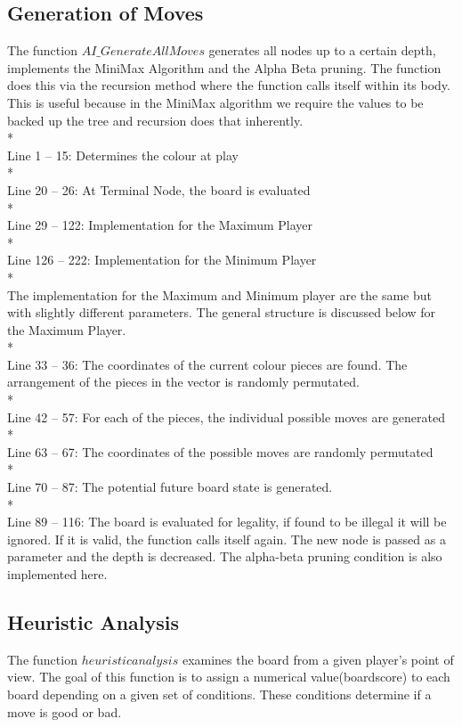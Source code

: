 \documentclass[11pt,a4paper]{article}
\begin{document}
\subsection{Generation of Moves}
\indent\indent The function $AI\_GenerateAllMoves$ generates all nodes up to a certain depth, implements the MiniMax Algorithm and the Alpha Beta pruning. The function does this via the recursion method where the function calls itself within its body. This is useful because in the MiniMax algorithm we require the values to be backed up the tree and recursion does that inherently.
\\*\\
Line 1 – 15: Determines the colour at play
\\*\\
Line 20 – 26: At Terminal Node, the board is evaluated
\\*\\
Line 29 – 122: Implementation for the Maximum Player
\\*\\
Line 126 – 222: Implementation for the Minimum Player\newline
\\*\\
\indent The implementation for the Maximum and Minimum player are the same but with slightly different parameters. The general structure is discussed below for the Maximum Player.
\\*\\
Line 33 – 36: The coordinates of the current colour pieces are found. The arrangement of the pieces in the vector is randomly permutated.
\\*\\
Line 42 – 57: For each of the pieces, the individual possible moves are generated
\\*\\
Line 63 – 67: The coordinates of the possible moves are randomly permutated
\\*\\
Line 70 – 87: The potential future board state is generated.
\\*\\
Line 89 – 116: The board is evaluated for legality, if found to be illegal it will be ignored. If it is valid, the function calls itself again. The new node is passed as a parameter and the depth is decreased. The alpha-beta pruning condition is also implemented here.

\subsection{Heuristic Analysis}
\indent\indent The function $heuristicanalysis$ examines the board from a given player’s point of view. The goal of this function is to assign a numerical value(boardscore) to each board depending on a given set of conditions. These conditions determine if a move is good or bad.\cite{chess6}\cite{chess7}
\end{document}
